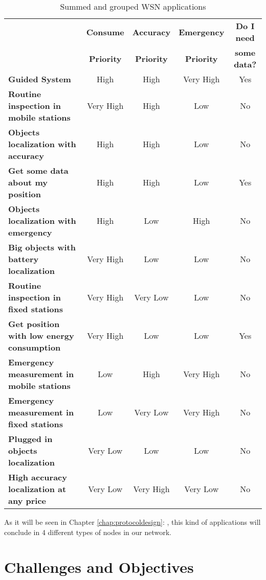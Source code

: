 \begin{table}[ht]\footnotesize
\begin{center}
 \begin{tabular}{l||cccc}
  \noalign{\vspace*{0.5cm}}
  & \textbf{Consume} & \textbf{Accuracy} & \textbf{Emergency} & \textbf{Do I need} \\
  & \textbf{Priority} & \textbf{Priority} & \textbf{Priority} & \textbf{some data?} \\
  \hline\hline
  \textbf{Guided System} & High & High & Very High & Yes \\
  \hline 
  \textbf{Routine inspection in mobile stations} & Very High & High & Low & No \\
  \hline
  \textbf{Objects localization with accuracy} & High & High & Low & No \\
  \hline
  \textbf{Get some data about my position} & High & High & Low & Yes \\
  \hline
  \textbf{Objects localization with emergency} & High & Low & High & No \\
  \hline
  \textbf{Big objects with battery localization} & Very High & Low & Low & No \\
  \hline
  \textbf{Routine inspection in fixed stations} & Very High & Very Low & Low & No \\
  \hline
  \textbf{Get position with low energy consumption} & Very High & Low & Low & Yes \\
  \hline
  \textbf{Emergency measurement in mobile stations} & Low & High & Very High & No \\
  \hline
  \textbf{Emergency measurement in fixed stations} & Low & Very Low & Very High & No \\
  \hline
  \textbf{Plugged in objects localization} & Very Low & Low & Low & No \\
  \hline
  \textbf{High accuracy localization at any price} & Very Low & Very High & Very Low & No \\
  \hline
  \end{tabular}
 \caption{Summed and grouped \ac{WSN} applications}
 \label{tab:wsn_applications}
\end{center}
\end{table}

As it will be seen in Chapter \ref{chap:protocoldesign}: , this kind of applications will conclude in 4 different 
types of nodes in our network.

\section{Challenges and Objectives}

